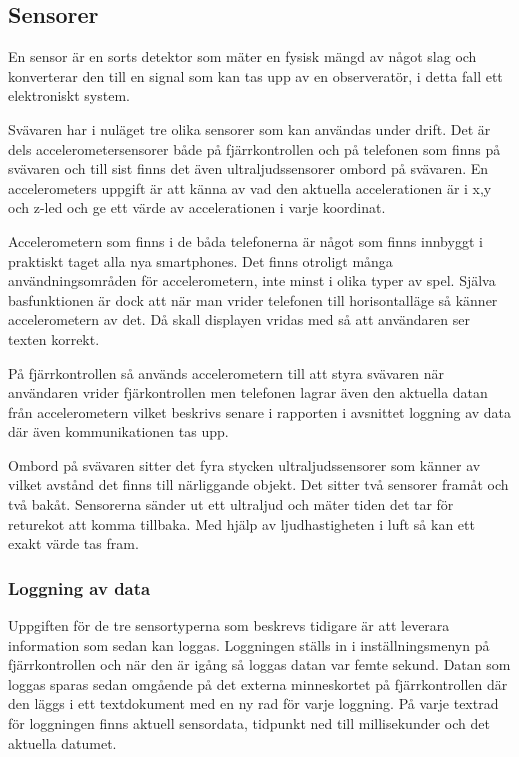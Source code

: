 \subsection{Sensorer}
En sensor är en sorts detektor som mäter en fysisk mängd av något slag och konverterar den till en signal som kan tas 
upp av en observeratör, i detta fall ett elektroniskt system.

Svävaren har i nuläget tre olika sensorer som kan användas under drift. Det är dels accelerometersensorer både 
på fjärrkontrollen och på telefonen som finns på svävaren och till sist finns det även ultraljudssensorer ombord på 
svävaren. En accelerometers uppgift är att känna av vad den aktuella accelerationen är i x,y och z-led och ge ett värde 
av accelerationen i varje koordinat.

Accelerometern som finns i de båda telefonerna är något som finns innbyggt i praktiskt taget alla nya smartphones. 
Det finns otroligt många användningsområden för accelerometern, inte minst i olika typer av spel. 
Själva basfunktionen är dock att när man vrider telefonen till horisontalläge så känner accelerometern av det. 
Då skall displayen vridas med så att användaren ser texten korrekt.

På fjärrkontrollen så används accelerometern till att styra svävaren när användaren vrider fjärkontrollen men telefonen 
lagrar även den aktuella datan från accelerometern vilket beskrivs senare i rapporten i avsnittet loggning av data där 
även kommunikationen tas upp.

Ombord på svävaren sitter det fyra stycken ultraljudssensorer som känner av vilket avstånd det finns till närliggande 
objekt. Det sitter två sensorer framåt och två bakåt. Sensorerna sänder ut ett ultraljud och mäter tiden det tar för 
returekot att komma tillbaka. Med hjälp av ljudhastigheten i luft så kan ett exakt värde tas fram.

\subsubsection{Loggning av data}
Uppgiften för de tre sensortyperna som beskrevs tidigare är att leverara information som sedan kan loggas. 
Loggningen ställs in i inställningsmenyn på fjärrkontrollen och när den är igång så loggas datan var femte sekund. 
Datan som loggas sparas sedan omgående på det externa minneskortet på fjärrkontrollen där den läggs i ett textdokument 
med en ny rad för varje loggning. På varje textrad för loggningen finns aktuell sensordata, tidpunkt ned till 
millisekunder och det aktuella datumet.

